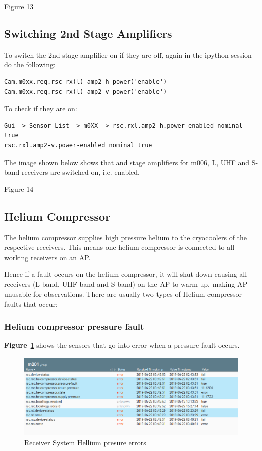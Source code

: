 Figure 13 
\subsection{ Switching 2nd Stage Amplifiers}
To switch the 2nd stage amplifier on if they are off, again in the ipython session do the following:
\begin{lstlisting}[style=DOS]
Cam.m0xx.req.rsc_rx(l)_amp2_h_power('enable')
Cam.m0xx.req.rsc_rx(l)_amp2_v_power('enable')
\end{lstlisting}

To check if they are on:
\begin{lstlisting}[style=DOS]
Gui -> Sensor List -> m0XX -> rsc.rxl.amp2-h.power-enabled nominal true
rsc.rxl.amp2-v.power-enabled nominal true
\end{lstlisting}
The image shown below shows that and stage amplifiers for m006, L, UHF and S-band receivers are switched on, i.e. enabled.


Figure 14
\subsection{ Helium Compressor}
The helium compressor supplies high pressure helium to the cryocoolers of the respective receivers. This means one helium compressor is connected to all working receivers on an AP. 

Hence if a fault occurs on the helium compressor, it will shut down causing all receivers (L-band, UHF-band and S-band) on the AP to warm up, making AP unusable for observations. There are usually two types of Helium compressor faults that occur:
\subsubsection{ Helium compressor pressure fault}
 \textbf{Figure}~\ref{fig:He1} shows the sensors that go into error when a pressure fault occurs.


\begin{figure}[!thb]
	\centering
	\includegraphics[scale=0.45]{Chapters/images/He1.png}
	
	\caption{Receiver System Hellium presure errors}
	\label{fig:He1}
\end{figure}
